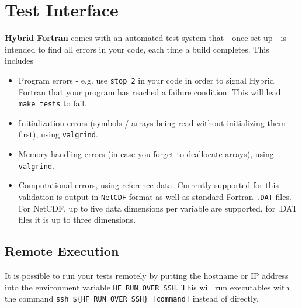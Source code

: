 \section{Test Interface} \label{sec:testSystem}
\textbf{Hybrid Fortran} comes with an automated test system that - once set up - is intended to find all errors in your code, each time a build completes. This includes
\begin{itemize}
 \item Program errors - e.g. use \verb|stop 2| in your code in order to signal Hybrid Fortran that your program has reached a failure condition. This will lead \verb|make tests| to fail.
 \item Initialization errors (symbols / arrays being read without initializing them first), using \verb|valgrind|.
 \item Memory handling errors (in case you forget to deallocate arrays), using \verb|valgrind|.
 \item Computational errors, using reference data. Currently supported for this validation is output in \verb|NetCDF| format as well as standard Fortran \verb|.DAT| files. For NetCDF, up to five data dimensions per variable are supported, for .DAT files it is up to three dimensions.
\end{itemize}

\subsection{Remote Execution}
It is possible to run your tests remotely by putting the hostname or IP address into the environment variable \verb|HF_RUN_OVER_SSH|. This will run executables with the command \verb|ssh ${HF_RUN_OVER_SSH} [command]| instead of directly.

